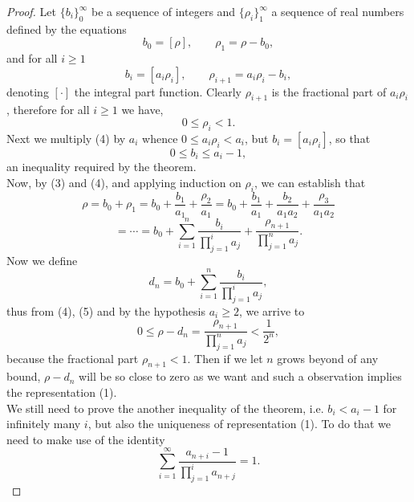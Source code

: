 \documentclass[12pt]{article}
\begin{document}
\begin{proof}
Let $\{b_i\}_0^\infty$ be a sequence of integers and $\{\rho_i\}_1^\infty$ a sequence of real numbers defined by the equations
\begin{equation}
b_0 = [\rho], \qquad \rho_1 = \rho - b_0,
\end{equation}
and for all $i\geq 1$
\begin{equation}
b_i = [a_i\rho_i], \qquad \rho_{i+1} = a_i\rho_i - b_i,
\end{equation}
denoting $[\cdot]$ the integral part function. Clearly $\rho_{i+1}$ is the fractional part of $a_i\rho_i$, therefore for all $i\geq 1$ we have,
\begin{equation}
0 \leq \rho_i < 1.
\end{equation}
Next we multiply (4) by $a_i$ whence $0 \leq a_i\rho_i < a_i$, but $b_i = [a_i\rho_i]$, so that
\begin{equation*}
0 \leq b_i \leq a_i - 1,
\end{equation*}
an inequality required by the theorem. \\
Now, by (3) and (4), and applying induction on $\rho_i$, we can establish that
\begin{equation*}
\rho=b_0+\rho_1=b_0+\frac{b_1}{a_1}+\frac{\rho_2}{a_1}=b_0+\frac{b_1}{a_1}+\frac{b_2}{a_1a_2}+\frac{\rho_3}{a_1a_2}
\end{equation*}
\begin{equation}
= \cdots = b_0 + \sum_{i=1}^n \frac{b_i}{\prod_{j=1}^i a_j} + \frac{\rho_{n+1}}{\prod_{j=1}^n a_j}.
\end{equation}
Now we define
\begin{equation*}
d_n = b_0 + \sum_{i=1}^n \frac{b_i}{\prod_{j=1}^i a_j},
\end{equation*}
thus from (4), (5) and by the hypothesis $a_i \geq 2$, we arrive to
\begin{equation*}
0 \leq \rho - d_n =  \frac{\rho_{n+1}}{\prod_{j=1}^n a_j} < \frac{1}{2^n},
\end{equation*}
because the fractional part $\rho_{n+1} < 1$. Then if we let $n$ grows beyond of any bound, $\rho - d_n$ will be so close to zero as we want and such a observation implies the representation (1). \\
We still need to prove the another inequality of the theorem, i.e. $b_i < a_i - 1$ for infinitely many $i$, but also the uniqueness of representation (1). To do that we need to make use of the identity
\begin{equation}
\sum_{i=1}^\infty \frac{a_{n+i}-1}{\prod_{j=1}^i a_{n+j}} = 1.

\end{equation}
\end{proof}
\end{document}
